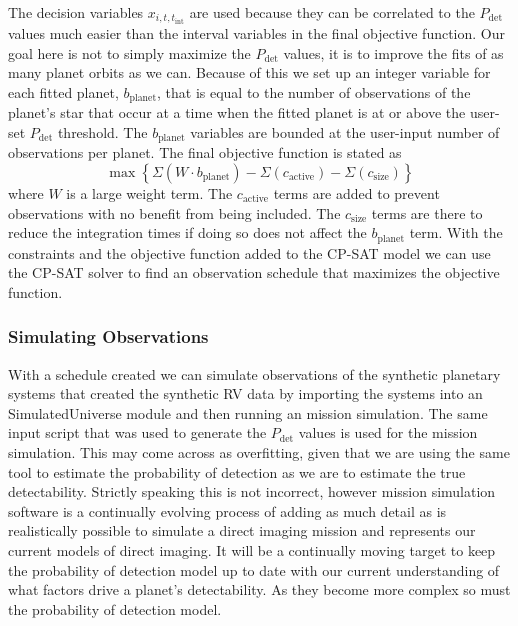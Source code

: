 The decision variables $x_{i, t, t_{\textrm{int}}}$ are used because they can
be correlated to the $P_\textrm{det}$ values much easier than the interval
variables in the final objective function. Our goal here is not to simply
maximize the $P_\textrm{det}$ values, it is to improve the fits of as many
planet orbits as we can. Because of this we set up an integer variable for each
fitted planet, $b_\textrm{planet}$, that is equal to the number of observations
of the planet's star that occur at a time when the fitted planet is at or above
the user-set $P_\textrm{det}$ threshold. The $b_\textrm{planet}$ variables are
bounded at the user-input number of observations per planet. The final
objective function is stated as 
\begin{equation}
  \max{\left\{ \Sigma\left(W \cdot
  b_\textrm{planet}\right) - \Sigma\left( c_\textrm{active}\right) - \Sigma\left(
  c_\textrm{size}\right) \right\}}
  \label{eq:final_obj_function}
\end{equation}
where $W$ is a large weight term. The
$c_\textrm{active}$ terms are added to prevent observations with no benefit
from being included. The $c_\textrm{size}$ terms are there to reduce the
integration times if doing so does not affect the $b_\textrm{planet}$ term.
With the constraints and the objective function added to the CP-SAT model we
can use the CP-SAT solver to find an observation schedule that maximizes the
objective function.

\subsubsection{Simulating Observations}

With a schedule created we can simulate observations of the synthetic planetary
systems that created the synthetic RV data by importing the systems into an
 SimulatedUniverse module and then running an 
mission simulation. The same  input script that was used to
generate the $P_\textrm{det}$ values is used for the mission simulation. This
may come across as overfitting, given that we are using the same tool to
estimate the probability of detection as we are to estimate the true
detectability. Strictly speaking this is not incorrect, however mission
simulation software is a continually evolving process of adding as much detail
as is realistically possible to simulate a direct imaging mission and
represents our current models of direct imaging. It will be a continually
moving target to keep the probability of detection model up to date with our
current understanding of what factors drive a planet's detectability. As they
become more complex so must the probability of detection model.

